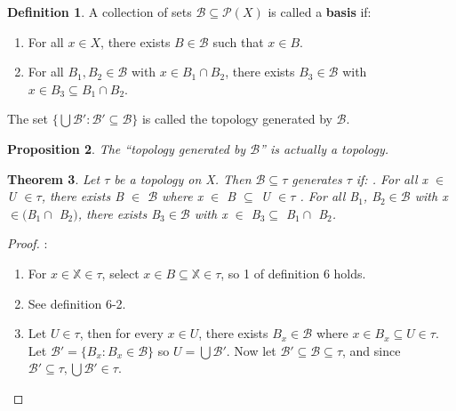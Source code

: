 \documentclass{amsart}
\theoremstyle{plain}
\newtheorem{theorem}{Theorem}
\newtheorem{proposition}[theorem]{Proposition}
\theoremstyle{definition}
\newtheorem{definition}[theorem]{Definition}
\theoremstyle{remark}
\begin{document}
	\begin{definition}
		A collection of sets \(\mathcal{B}\subseteq\mathcal{P}(X)\) is
		called a \textbf{basis} if:
		\begin{enumerate}
			\item For all \(x\in X\), there exists \(B\in\mathcal{B}\) such that
			\(x\in B\).
			\item  For all \(B_1,B_2 \in \mathcal{B}\) with \(x \in B_1 \cap B_2\), there exists \(B_3 \in \mathcal{B}\) with
			\(x\in B_3 \subseteq B_1 \cap B_2\).
		\end{enumerate}
	  The set \(\{\bigcup\mathcal{B}':\mathcal{B}'\subseteq\mathcal{B}\}\)
		is called the topology generated by \(\mathcal{B}\). \cite{Clontz2010}
	\end{definition}

	\begin{proposition}
		The ``topology generated by \(\mathcal{B}\)'' is actually a topology.
	\end{proposition}

	\begin{theorem}
	Let $\tau$ be a topology on X. Then $\mathcal{B} \subseteq \tau$ generates $\tau$ if:
	. For all x $\in$ U $\in \tau$, there exists B $\in$ $\mathcal{B}$ where x $\in$ B $\subseteq$ U $\in \tau$
	. For all B$_1$, B$_2 \in \mathcal{B}$ with x $\in ($B$_1 \cap$ B$_2)$, there exists B$_3 \in \mathcal{B}$ with x $\in$ B$_3 \subseteq$ B$_1 \cap$ B$_2$.
\end{theorem}
\begin{proof}:\newline
	\begin{enumerate}
		\item For $x \in \mathbb{X} \in \tau$, select $x \in B \subseteq \mathbb{X} \in \tau$, so 1 of definition 6 holds.
		\item See definition 6-2.
		\item Let $U \in \tau$, then for every $x \in U$, there exists $B_x \in \mathcal{B}$ where $x \in B_x \subseteq U \in \tau$. Let $\mathcal{B'} = \lbrace B_x : B_x \in \mathcal{B} \rbrace$ so $U = \bigcup \mathcal{B'}$. Now let $\mathcal{B'} \subseteq \mathcal{B} \subseteq \tau$, and since $\mathcal{B'} \subseteq \tau, \bigcup \mathcal{B'} \in \tau$.
		\end{enumerate}
\end{proof}
\end{document}
